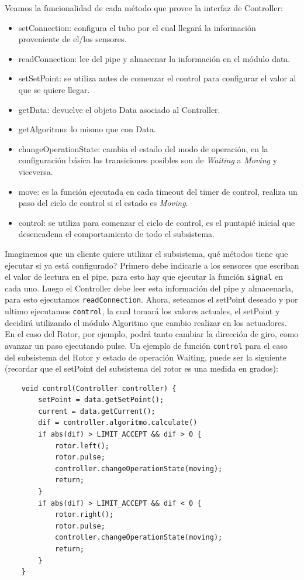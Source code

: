 Veamos la funcionalidad de cada método que provee la interfaz de Controller:
\begin{itemize}
    \item setConnection: configura el tubo por el cual llegará la información proveniente de el/los sensores.
    \item readConnection: lee del pipe y almacenar la información en el módulo data.
    \item setSetPoint: se utiliza antes de comenzar el control para configurar el valor al que se quiere llegar.
    \item getData: devuelve el objeto Data asociado al Controller.
    \item getAlgoritmo: lo mismo que con Data.
    \item changeOperationState: cambia el estado del modo de operación, en la configuración básica las transiciones posibles son de \textit{Waiting} a \textit{Moving} y viceversa.
    \item move: es la función ejecutada en cada timeout del timer de control, realiza un paso del ciclo de control si el estado es \textit{Moving}.
    \item control: se utiliza para comenzar el ciclo de control, es el puntapié inicial que desencadena el comportamiento de todo el subsistema.
\end{itemize}

Imaginemos que un cliente quiere utilizar el subsistema, qué métodos tiene que ejecutar si ya está configurado? Primero debe indicarle a los sensores que escriban el valor de lectura en el pipe, para esto hay que ejecutar la función \verb|signal| en cada uno. Luego el Controller debe leer esta información del pipe y almacenarla, para esto ejecutamos \verb|readConnection|. Ahora, seteamos el setPoint deseado y por ultimo ejecutamos \verb|control|, la cual tomará los valores actuales, el setPoint y decidirá utilizando el módulo Algoritmo que cambio realizar en los actuadores. En el caso del Rotor, por ejemplo, podrá tanto cambiar la dirección de giro, como avanzar un paso ejecutando pulse. Un ejemplo de función \verb|control| para el caso del subsistema del Rotor y estado de operación Waiting, puede ser la siguiente (recordar que el setPoint del subsistema del rotor es una medida en grados):

\begin{lstlisting}
    void control(Controller controller) {
        setPoint = data.getSetPoint();
        current = data.getCurrent();
        dif = controller.algoritmo.calculate()
        if abs(dif) > LIMIT_ACCEPT && dif > 0 {
            rotor.left();
            rotor.pulse;
            controller.changeOperationState(moving);
            return;
        }
        if abs(dif) > LIMIT_ACCEPT && dif < 0 {
            rotor.right();
            rotor.pulse;
            controller.changeOperationState(moving);
            return;
        }
    }
\end{lstlisting}

